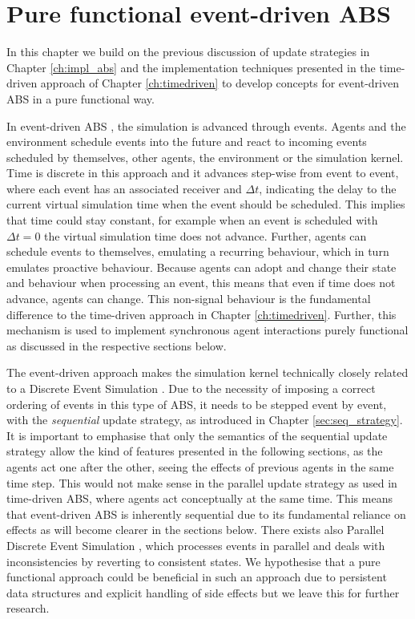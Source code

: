 \chapter{Pure functional event-driven ABS}
\label{ch:eventdriven}
In this chapter we build on the previous discussion of update strategies in Chapter \ref{ch:impl_abs} and the implementation techniques presented in the time-driven approach of Chapter \ref{ch:timedriven} to develop concepts for event-driven ABS in a pure functional way. 

\medskip

In event-driven ABS \cite{meyer_event-driven_2014}, the simulation is advanced through events. Agents and the environment schedule events into the future and react to incoming events scheduled by themselves, other agents, the environment or the simulation kernel. Time is discrete in this approach and it advances step-wise from event to event, where each event has an associated receiver and $\Delta t$, indicating the delay to the current virtual simulation time when the event should be scheduled. This implies that time could stay constant, for example when an event is scheduled with $\Delta t = 0$ the virtual simulation time does not advance. Further, agents can schedule events to themselves, emulating a recurring behaviour, which in turn emulates proactive behaviour. Because agents can adopt and change their state and behaviour when processing an event, this means that even if time does not advance, agents can change. This non-signal behaviour is the fundamental difference to the time-driven approach in Chapter \ref{ch:timedriven}. Further, this mechanism is used to implement synchronous agent interactions purely functional as discussed in the respective sections below.

The event-driven approach makes the simulation kernel technically closely related to a Discrete Event Simulation \cite{zeigler_theory_2000}. Due to the necessity of imposing a correct ordering of events in this type of ABS, it needs to be stepped event by event, with the \textit{sequential} update strategy, as introduced in Chapter \ref{sec:seq_strategy}. It is important to emphasise that only the semantics of the sequential update strategy allow the kind of features  presented in the following sections, as the agents act one after the other, seeing the effects of previous agents in the same time step. This would not make sense in the parallel update strategy as used in time-driven ABS, where agents act conceptually at the same time. This means that event-driven ABS is inherently sequential due to its fundamental reliance on effects as will become clearer in the sections below. There exists also Parallel Discrete Event Simulation \cite{fujimoto_parallel_1990}, which processes events in parallel and deals with inconsistencies by reverting to consistent states. We hypothesise that a pure functional approach could be beneficial in such an approach due to persistent data structures and explicit handling of side effects but we leave this for further research.

